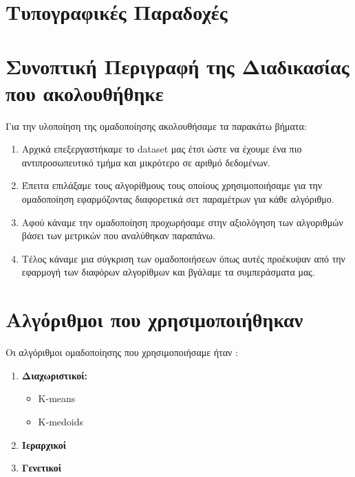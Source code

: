 \section{Τυπογραφικές Παραδοχές}

\section{Συνοπτική Περιγραφή της Διαδικασίας που ακολουθήθηκε}
Για την υλοποίηση της ομαδοποίησης ακολουθήσαμε τα παρακάτω βήματα:
\begin{enumerate}
	\item Αρχικά επεξεργαστήκαμε το dataset μας έτσι ώστε να έχουμε ένα πιο αντιπροσωπευτικό τμήμα και μικρότερο σε αριθμό δεδομένων. 
	\item Έπειτα επιλάξαμε τους αλγορίθμους τους οποίους χρησιμοποιήσαμε για την ομαδοποίηση εφαρμόζοντας διαφορετικά σετ παραμέτρων για κάθε αλγόριθμο.
	\item Αφού κάναμε την ομαδοποίηση προχωρήσαμε στην αξιολόγηση των αλγοριθμών βάσει των μετρικών που αναλύθηκαν παραπάνω.
	\item Τέλος κάναμε μια σύγκριση των ομαδοποιήσεων όπως αυτές προέκυψαν από την εφαρμογή των διαφόρων αλγορίθμων και βγάλαμε τα συμπεράσματα μας.
\end{enumerate}

\section{Αλγόριθμοι που χρησιμοποιήθηκαν}
Οι αλγόριθμοι ομαδοποίησης που χρησιμοποιήσαμε ήταν :
\begin{enumerate}
	\item \textbf{Διαχωριστικοί:}
	\begin{itemize}
		\item K-means
		\item K-medoids
	\end{itemize}  
	\item \textbf{Ιεραρχικοί}
	\item \textbf{Γενετικοί}  
\end{enumerate}


